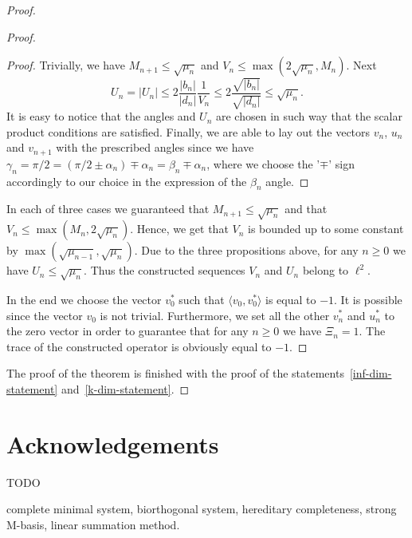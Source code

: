 \documentclass[12pt]{amsart}
\theoremstyle{case}
\begin{document}
\begin{proof}
\begin{proof}
\begin{proof}
            Trivially, we have $M_{n+1} \leq \sqrt{\mu_n}$ and $V_n \leq \max(2\sqrt{\mu_n}, M_n)$.
            Next
            \[
              U_n = |U_n| \leq 2 \frac{|b_n|}{|d_n|} \frac{1}{V_n} \leq 2 \frac{\sqrt{|b_n|}}{\sqrt{|d_n|}} \leq \sqrt{\mu_n}.
            \]
            It is easy to notice that the angles and $U_n$ are chosen in such way that the scalar product conditions are satisfied.
            Finally, we are able to lay out the vectors $v_n$, $u_n$ and $v_{n+1}$ with the prescribed angles 
              since we have $\gamma_n = \pi/2 = (\pi/2 \pm \alpha_n) \mp \alpha_n = \beta_n \mp \alpha_n$,
              where we choose the '$\mp$' sign accordingly to our choice in the expression of the $\beta_n$ angle.
          \end{proof}
        In each of three cases we guaranteed that $M_{n+1} \leq \sqrt{\mu_n}$ and
          that $V_n \leq \max(M_n, 2\sqrt{\mu_n})$.
        Hence, we get that $V_n$ is bounded up to some constant by $\max(\sqrt{\mu_{n-1}}, \sqrt{\mu_n})$.
        Due to the three propositions above, for any $n \geq 0$ we have $U_n \leq \sqrt{\mu_n}$.
        Thus the constructed sequences $V_n$ and $U_n$ belong to $\ell^2$.

        In the end we choose the vector $v_0^*$ such that $\langle v_0, v_0^*\rangle$ is equal to $-1$.
        It is possible since the vector $v_0$ is not trivial.
        Furthermore, we set all the other $v^*_n$ and $u^*_n$ to the zero vector in order to guarantee that for any $n \geq 0$ we have $\Xi_n = 1$.
        The trace of the constructed operator is obviously equal to $-1$.
      \end{proof}
      The proof of the theorem is finished with the proof of the statements~\ref{inf-dim-statement} and~\ref{k-dim-statement}.
    \end{proof}
  \section{Acknowledgements}
    TODO
    
\medskip
\bigskip
{} complete minimal system, biorthogonal system, hereditary completeness, strong M-basis, linear summation method.
\end{document}
